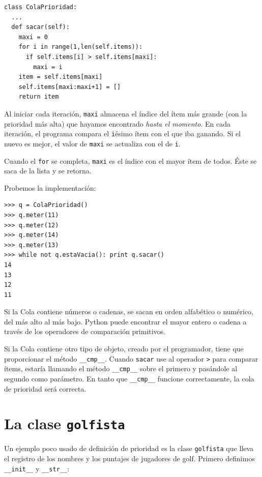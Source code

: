 \beforeverb
\begin{verbatim}
class ColaPrioridad:
  ...
  def sacar(self):
    maxi = 0
    for i in range(1,len(self.items)):
      if self.items[i] > self.items[maxi]:
        maxi = i
    item = self.items[maxi]
    self.items[maxi:maxi+1] = []
    return item
\end{verbatim}
\afterverb
%
Al iniciar cada iteración,  \texttt{maxi} almacena el índice del ítem
más grande (con la prioridad más alta) que hayamos encontrado
{\em hasta el momento}.  En cada iteración, el programa compara el
 \texttt{i}ésimo ítem con el que iba ganando. Si el nuevo es mejor,
el valor de  \texttt{maxi} se actualiza con el de  \texttt{i}.


Cuando el  \texttt{for} se completa, \texttt{maxi} es el índice con el 
mayor ítem de todos. Éste se saca de la lista y se retorna.

Probemos la implementación:

\beforeverb
\begin{verbatim}
>>> q = ColaPrioridad()
>>> q.meter(11)
>>> q.meter(12)
>>> q.meter(14)
>>> q.meter(13)
>>> while not q.estaVacia(): print q.sacar()
14
13
12
11
\end{verbatim}
\afterverb
%
Si la Cola contiene números o cadenas, se sacan en orden alfabético
o numérico, del más alto al más bajo. Python puede encontrar el 
mayor entero o cadena a través de los operadores de comparación 
primitivos.

Si la Cola contiene otro tipo de objeto, creado por el programador,
tiene que proporcionar el método \texttt{\_\_cmp\_\_}.  Cuando
 \texttt{sacar} use al operador \texttt{>} para comparar ítems,
estaría llamando el método  \texttt{\_\_cmp\_\_} sobre el primero
y pasándole al segundo como parámetro. En tanto que  \texttt{\_\_cmp\_\_} 
funcione correctamente, la cola de prioridad será correcta.


\section{La clase \texttt{golfista}}

Un ejemplo poco usado de definición de prioridad es la clase
\texttt{golfista} que lleva el registro de los nombres y los
puntajes de jugadores de golf. Primero definimos {\tt \_\_init\_\_} 
y \texttt{\_\_str\_\_}:

